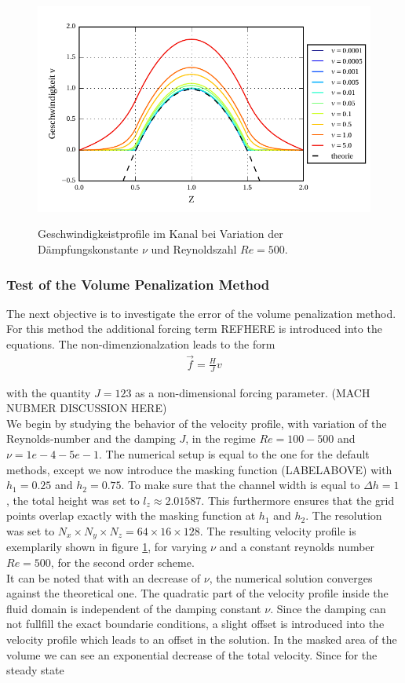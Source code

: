 \begin{figure}[!b]
  \centering
  \includegraphics{gfx/immersed_boundary/poiseuille_flow/2_vp/vp_profile.pdf}\label{fig:vp_flow}
  \caption{Geschwindigkeistprofile im Kanal bei Variation der Dämpfungskonstante $\nu$ und Reynoldszahl $Re=500$.}
\end{figure}

\subsubsection{Test of the Volume Penalization Method}

The next objective is to investigate the error of the volume penalization method.
For this method the additional forcing term REFHERE is introduced into the equations. The non-dimenzionalzation leads to the form
\begin{align}
    \vec{f} = \frac{H}{J}v
\end{align}

with the quantity $J = 123$ as a non-dimensional forcing parameter.
(MACH NUBMER DISCUSSION HERE) \\
We begin by studying the behavior of the velocity profile, with variation of the Reynolds-number and the damping $J$, in the regime $Re=100-500$ and $\nu=1e-4 - 5e-1$.
The numerical setup is equal to the one for the default methods, except we now introduce the masking function (LABELABOVE) with $h_1=0.25$ and $h_2=0.75$.
To make sure that the channel width is equal to $\Delta h = 1$, the total height was set to $l_z\approx2.01587$. This furthermore ensures that the grid points overlap exactly
with the masking function at $h_1$ and $h_2$. The resolution was set to $N_x\times N_y\times N_z = 64\times16\times128$.
The resulting velocity profile is exemplarily shown in figure \ref{fig:vp_flow}, for varying $\nu$ and a constant reynolds number $Re=500$, for the second order scheme.\\
It can be noted that with an decrease of $\nu$, the numerical solution converges against the theoretical one.
The quadratic part of the velocity profile inside the fluid domain is independent of the damping constant $\nu$.
Since the damping can not fullfill the exact boundarie conditions, a slight offset is introduced into the velocity profile
which leads to an offset in the solution.
In the masked area of the volume we can see an exponential decrease of the total velocity.
Since for the steady state

